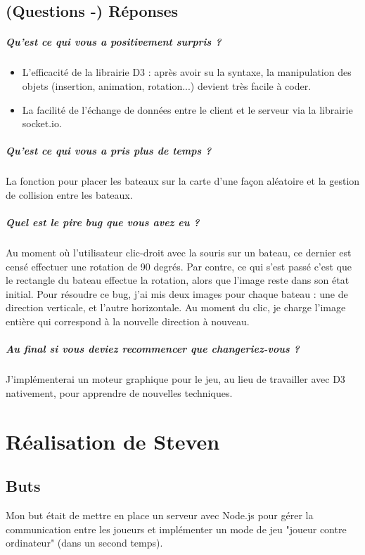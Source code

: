 \documentclass[a4paper, 11pt]{article}
\begin{document}
\subsection{(Questions -) Réponses}
\subparagraph{Qu’est ce qui vous a positivement surpris ?}
\begin{itemize}
\item L'efficacité de la librairie D3 : après avoir su la syntaxe, la manipulation des objets (insertion, animation, rotation...) devient très facile à coder.
\item La facilité de l'échange de données entre le client et le serveur via la librairie socket.io.
\end{itemize}
\subparagraph{Qu’est ce qui vous a pris plus de temps ?}
La fonction pour placer les bateaux sur la carte d'une façon aléatoire et la gestion de collision entre les bateaux.
\subparagraph{Quel est le pire bug que vous avez eu ?}
Au moment où l'utilisateur clic-droit avec la souris sur un bateau, ce dernier est censé effectuer une rotation de 90 degrés. Par contre, ce qui s'est passé c'est que
le rectangle du bateau effectue la rotation, alors que l'image reste dans son état initial. Pour résoudre ce bug, j'ai mis deux images pour chaque bateau : 
une de direction verticale, et l'autre horizontale. Au moment du clic, je charge l'image entière qui correspond à la nouvelle direction à nouveau.
\subparagraph{Au final si vous deviez recommencer que changeriez-vous ?}
J'implémenterai un moteur graphique pour le jeu, au lieu de travailler avec D3 nativement, pour apprendre de nouvelles techniques.

\section{Réalisation de Steven}
\subsection{Buts}
Mon but était de mettre en place un serveur avec Node.js pour gérer la communication entre les joueurs et implémenter un mode de jeu "joueur contre ordinateur" (dans un second temps).
\end{document}
